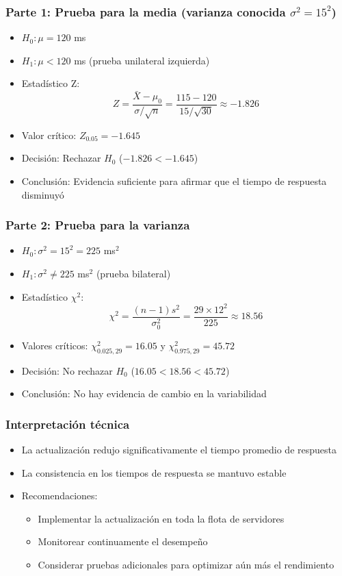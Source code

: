 \subsubsection*{Parte 1: Prueba para la media (varianza conocida $\sigma^2 = 15^2$)}
\begin{itemize}
\item $H_0: \mu = 120$ ms
\item $H_1: \mu < 120$ ms (prueba unilateral izquierda)
\item Estadístico Z:
\[
Z = \frac{\bar{X} - \mu_0}{\sigma/\sqrt{n}} = \frac{115 - 120}{15/\sqrt{30}} \approx -1.826
\]
\item Valor crítico: $Z_{0.05} = -1.645$
\item Decisión: Rechazar $H_0$ ($-1.826 < -1.645$)
\item Conclusión: Evidencia suficiente para afirmar que el tiempo de respuesta disminuyó
\end{itemize}

\subsubsection*{Parte 2: Prueba para la varianza}
\begin{itemize}
\item $H_0: \sigma^2 = 15^2 = 225$ ms$^2$
\item $H_1: \sigma^2 \neq 225$ ms$^2$ (prueba bilateral)
\item Estadístico $\chi^2$:
\[
\chi^2 = \frac{(n-1)s^2}{\sigma_0^2} = \frac{29 \times 12^2}{225} \approx 18.56
\]
\item Valores críticos: $\chi^2_{0.025,29} = 16.05$ y $\chi^2_{0.975,29} = 45.72$
\item Decisión: No rechazar $H_0$ ($16.05 < 18.56 < 45.72$)
\item Conclusión: No hay evidencia de cambio en la variabilidad
\end{itemize}

\subsubsection*{Interpretación técnica}
\begin{itemize}
\item La actualización redujo significativamente el tiempo promedio de respuesta
\item La consistencia en los tiempos de respuesta se mantuvo estable
\item Recomendaciones:
\begin{itemize}
\item Implementar la actualización en toda la flota de servidores
\item Monitorear continuamente el desempeño
\item Considerar pruebas adicionales para optimizar aún más el rendimiento
\end{itemize}
\end{itemize}


